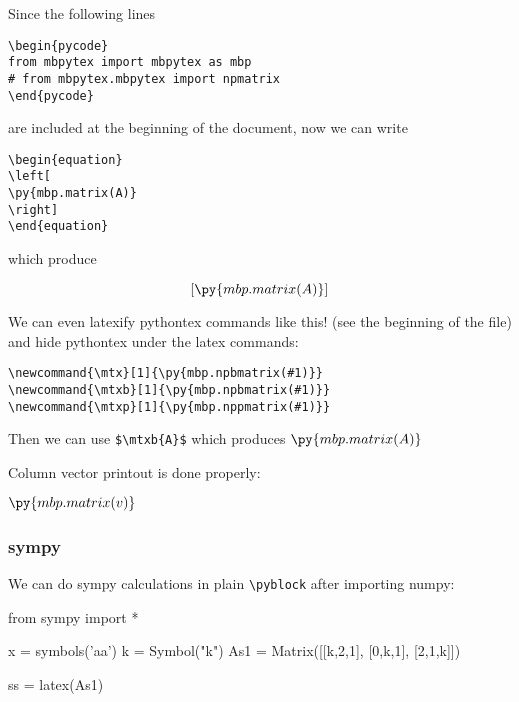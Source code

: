 \documentclass[11pt]{article}
\newcommand{\mtx}[1]{\py{mbp.matrix(#1)}}
\newcommand{\mtxb}[1]{\py{mbp.matrix(#1)}}
\newcommand{\mtxp}[1]{\py{mbp.matrix(#1)}}
\begin{document}
Since the following lines 
\begin{verbatim}
\begin{pycode}
from mbpytex import mbpytex as mbp
# from mbpytex.mbpytex import npmatrix
\end{pycode}
\end{verbatim}
are included at the beginning of the document, now we can write

\begin{verbatim}
\begin{equation}
\left[
\py{mbp.matrix(A)}
\right]
\end{equation}
\end{verbatim}

which produce

\begin{equation}
\left[
\py{mbp.matrix(A)}
\right]
\end{equation}


\vspace{0.5cm}

We can even latexify pythontex commands like this! (see the beginning of the file) and hide pythontex under the latex commands:
\begin{verbatim}
\newcommand{\mtx}[1]{\py{mbp.npbmatrix(#1)}}
\newcommand{\mtxb}[1]{\py{mbp.npbmatrix(#1)}}
\newcommand{\mtxp}[1]{\py{mbp.nppmatrix(#1)}}
\end{verbatim}

Then we can use
\verb|$\mtxb{A}$|
which produces
$\py{mbp.matrix(A)}$ %

Column vector printout is done properly:

$\py{mbp.matrix(v)}$ %


\subsubsection{sympy}

We can do sympy calculations in plain \verb|\pyblock| after importing numpy:
\begin{pyblock}
from sympy import *

x = symbols('aa')
k = Symbol("k")
As1 = Matrix([[k,2,1],
              [0,k,1],
              [2,1,k]])

ss = latex(As1)
\end{pyblock}
\end{document}
